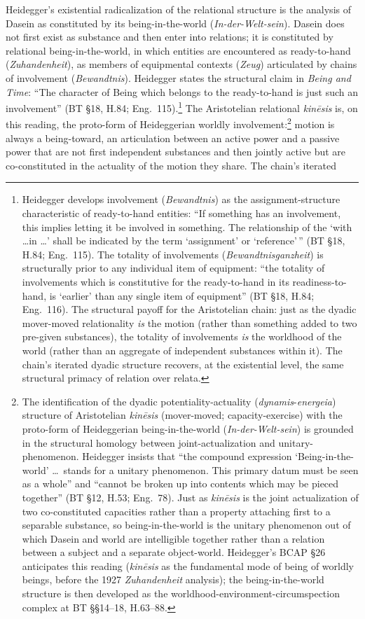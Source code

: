 Heidegger's existential radicalization of the relational structure is the analysis of Dasein as constituted by its being-in-the-world (\textit{In-der-Welt-sein}). Dasein does not first exist as substance and then enter into relations; it is constituted by relational being-in-the-world, in which entities are encountered as ready-to-hand (\textit{Zuhandenheit}), as members of equipmental contexts (\textit{Zeug}) articulated by chains of involvement (\textit{Bewandtnis}). Heidegger states the structural claim in \textit{Being and Time}: ``The character of Being which belongs to the ready-to-hand is just such an involvement'' (BT \S 18, H.84; Eng.~115).\footnote{Heidegger develops involvement (\textit{Bewandtnis}) as the assignment-structure characteristic of ready-to-hand entities: ``If something has an involvement, this implies letting it be involved in something. The relationship of the `with \ldots in \ldots ' shall be indicated by the term `assignment' or `reference'\,'' (BT §18, H.84; Eng.~115). The totality of involvements (\textit{Bewandtnisganzheit}) is structurally prior to any individual item of equipment: ``the totality of involvements which is constitutive for the ready-to-hand in its readiness-to-hand, is `earlier' than any single item of equipment'' (BT §18, H.84; Eng.~116). The structural payoff for the Aristotelian chain: just as the dyadic mover-moved relationality \textit{is} the motion (rather than something added to two pre-given substances), the totality of involvements \textit{is} the worldhood of the world (rather than an aggregate of independent substances within it). The chain's iterated dyadic structure recovers, at the existential level, the same structural primacy of relation over relata.} The Aristotelian relational \textit{kinēsis} is, on this reading, the proto-form of Heideggerian worldly involvement:\footnote{The identification of the dyadic potentiality-actuality (\textit{dynamis}-\textit{energeia}) structure of Aristotelian \textit{kinēsis} (mover-moved; capacity-exercise) with the proto-form of Heideggerian being-in-the-world (\textit{In-der-Welt-sein}) is grounded in the structural homology between joint-actualization and unitary-phenomenon. Heidegger insists that ``the compound expression `Being-in-the-world' \ldots\ stands for a unitary phenomenon. This primary datum must be seen as a whole'' and ``cannot be broken up into contents which may be pieced together'' (BT §12, H.53; Eng.~78). Just as \textit{kinēsis} is the joint actualization of two co-constituted capacities rather than a property attaching first to a separable substance, so being-in-the-world is the unitary phenomenon out of which Dasein and world are intelligible together rather than a relation between a subject and a separate object-world. Heidegger's BCAP §26 anticipates this reading (\textit{kinēsis} as the fundamental mode of being of worldly beings, before the 1927 \textit{Zuhandenheit} analysis); the being-in-the-world structure is then developed as the worldhood-environment-circumspection complex at BT §§14--18, H.63--88.} motion is always a being-toward, an articulation between an active power and a passive power that are not first independent substances and then jointly active but are co-constituted in the actuality of the motion they share. The chain's iterated 